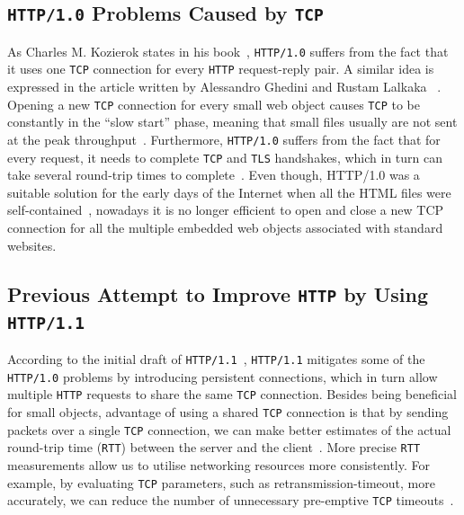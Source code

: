 \documentclass[12pt,a4paper,twoside,openright]{report}
\begin{document}
\subsection{\texttt{HTTP/1.0} Problems Caused by \texttt{TCP}}
    As Charles M. Kozierok states in his book~\cite{TCP_IP_Guide_Book},
    \texttt{HTTP/1.0} suffers from the fact that it uses one \texttt{TCP} connection for every \texttt{HTTP} request-reply pair. 
    A similar idea is expressed in the article written by Alessandro Ghedini and Rustam Lalkaka
   ~\cite{HTTP_3_the_past_the_present_and_the_future}.
    Opening a new \texttt{TCP} connection for every small web object causes \texttt{TCP} to be constantly in the \enquote{slow start} phase, meaning that small files usually are not sent at the peak throughput~\cite{HTTP_3_the_past_the_present_and_the_future}.
    Furthermore, \texttt{HTTP/1.0} suffers from the fact that for every request, it needs to complete \texttt{TCP} and \texttt{TLS} handshakes, which in turn can take several round-trip times to complete~\cite{HTTP_3_the_past_the_present_and_the_future}.
    Even though, HTTP/1.0 was a suitable solution for the early days of the Internet when all the HTML files were self-contained~\cite{TCP_IP_Guide_Book_2}, nowadays it is no longer efficient to open and close a new TCP connection for all the multiple embedded web objects associated with standard websites.

\subsection{Previous Attempt to Improve \texttt{HTTP} by Using \texttt{HTTP/1.1}}

According to the initial draft of \texttt{HTTP/1.1}~\cite{RFC2068}, \texttt{HTTP/1.1} mitigates some of the \texttt{HTTP/1.0} problems by introducing persistent connections, which in turn allow multiple \texttt{HTTP} requests to share the same \texttt{TCP} connection.
Besides being beneficial for small objects, advantage of using a shared \texttt{TCP} connection is that by sending packets over a single \texttt{TCP} connection, we can make better estimates of the actual round-trip time (\texttt{RTT}) between the server and the client~\cite{bib_Computer_Networking_L6}.
More precise \texttt{RTT} measurements allow us to utilise networking resources more consistently.
For example, by evaluating \texttt{TCP} parameters, such as retransmission-timeout, more accurately, we can reduce the number of unnecessary pre-emptive \texttt{TCP} timeouts~\cite{bib_rtt_tcp_Retransmissions}.
\end{document}
